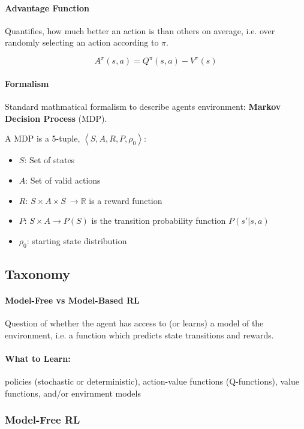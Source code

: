 \paragraph{Advantage Function}
Quantifies, how much better an action is than others on average, i.e. over randomly selecting an action according to $\pi$.

$$ A^{\pi}(s, a)=Q^{\pi}(s, a)-V^{\pi}(s) $$

\paragraph{Formalism}
Standard mathmatical formalism to describe agents environment: \textbf{Markov Decision Process} (MDP).

A MDP is a 5-tuple, \( \left\langle S, A, R, P, \rho_{0}\right\rangle \):
\begin{itemize}
    \item \(S\): Set of states
    \item \(A\): Set of valid actions
    \item \(R\): \( S \times A \times S \ \rightarrow \mathbb{R}\) is a reward function
    \item \(P\): \( S \times A \rightarrow P(S) \) is the transition probability function \(P (s' | s,a)\)
    \item \(\rho_0\): starting state distribution
\end{itemize}

\subsection{Taxonomy}
\paragraph{Model-Free vs Model-Based RL} 
Question of whether the agent has access to (or learns) a model of the environment, i.e. a function which predicts state transitions and rewards.

\paragraph{What to Learn:} policies (stochastic or deterministic), action-value functions (Q-functions), value functions, and/or envirnment models

\subsubsection{Model-Free RL}
